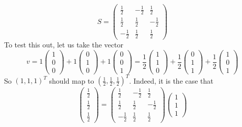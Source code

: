 \begin{example}
\begin{equation}
			S = \begin{pmatrix}
				\frac{1}{2} & -\frac{1}{2} & \frac{1}{2} \\ 
				\frac{1}{2} & \frac{1}{2} & -\frac{1}{2} \\ 
				-\frac{1}{2} & \frac{1}{2} & \frac{1}{2} 
			\end{pmatrix}
		\end{equation}
		To test this out, let us take the vector 
		\begin{equation}
			v = 1 \begin{pmatrix} 1 \\ 0 \\ 0 \end{pmatrix} + 1 \begin{pmatrix} 0 \\ 1 \\ 0 \end{pmatrix} + 1 \begin{pmatrix} 0 \\ 0 \\ 1 \end{pmatrix} = \frac{1}{2} \begin{pmatrix} 1 \\ 1 \\ 0 \end{pmatrix} + \frac{1}{2} \begin{pmatrix} 0 \\ 1 \\ 1 \end{pmatrix} + \frac{1}{2} \begin{pmatrix} 1 \\ 0 \\ 1 \end{pmatrix} 
		\end{equation}
		So $(1, 1, 1)^T$ should map to $(\frac{1}{2}, \frac{1}{2}, \frac{1}{2})^T$. Indeed, it is the case that 
		\begin{equation}
		  \begin{pmatrix}
				\frac{1}{2} \\ \frac{1}{2} \\ \frac{1}{2}
		  \end{pmatrix} = \begin{pmatrix}
				\frac{1}{2} & -\frac{1}{2} & \frac{1}{2} \\ 
				\frac{1}{2} & \frac{1}{2} & -\frac{1}{2} \\ 
				-\frac{1}{2} & \frac{1}{2} & \frac{1}{2} 
			\end{pmatrix} \begin{pmatrix} 
				1 \\ 1 \\ 1
			\end{pmatrix}
		\end{equation}
	\end{example}

